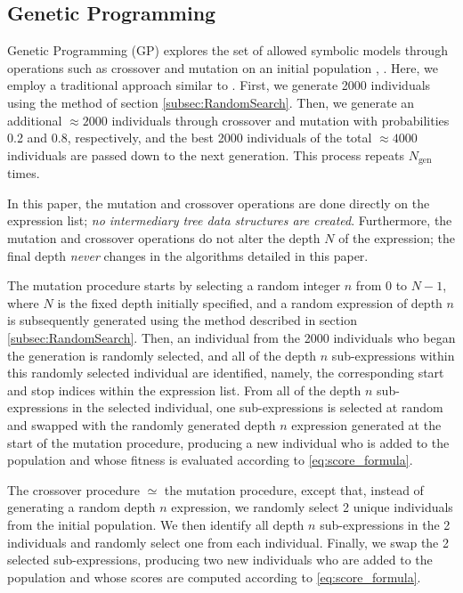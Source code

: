 \documentclass[runningheads]{llncs}
\begin{document}
\subsection{Genetic Programming} \label{subsec:GeneticProgramming}
Genetic Programming (GP) explores the set of allowed symbolic models through operations such as crossover and mutation on an initial population \cite{manti2023discovering} \cite{PoliFieldGuideGP}, \cite{Koza1994}. Here, we employ a traditional approach similar to \cite{manti2023discovering}. First, we generate 2000 individuals using the method of section \ref{subsec:RandomSearch}. Then, we generate an additional $\approx 2000$ individuals through crossover and mutation with probabilities 0.2 and 0.8, respectively, and the best 2000 individuals of the total $\approx 4000$ individuals are passed down to the next generation. This process repeats $N_{\mathrm{gen}}$ times.
\par In this paper, the mutation and crossover operations are done directly on the expression list; \emph{no intermediary tree data structures are created}. Furthermore, the mutation and crossover operations do not alter the depth $N$ of the expression; the final depth \emph{never} changes in the algorithms detailed in this paper. 
\par The mutation procedure starts by selecting a random integer $n$ from $0$ to $N-1$, where $N$ is the fixed depth initially specified, and a random expression of depth $n$ is subsequently generated using the method described in section \ref{subsec:RandomSearch}. Then, an individual from the 2000 individuals who began the generation is randomly selected, and all of the depth $n$ sub-expressions within this randomly selected individual are identified, namely, the corresponding start and stop indices within the expression list. From all of the depth $n$ sub-expressions in the selected individual, one sub-expressions is selected at random and swapped with the randomly generated depth $n$ expression generated at the start of the mutation procedure, producing a new individual who is added to the population and whose fitness is evaluated according to \ref{eq:score_formula}.
\par The crossover procedure $\simeq$ the mutation procedure, except that, instead of generating a random depth $n$ expression, we randomly select 2 unique individuals from the initial population. We then identify all depth $n$ sub-expressions in the 2 individuals and randomly select one from each individual. Finally, we swap the 2 selected sub-expressions, producing two new individuals who are added to the population and whose scores are computed according to \ref{eq:score_formula}.
\end{document}
